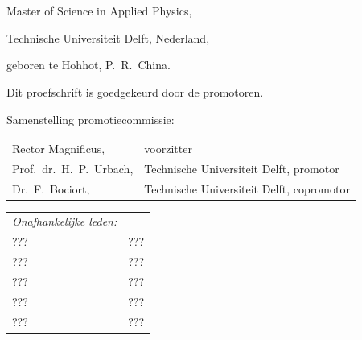 \begin{titlepage}
\begin{center}
\makeatletter
{\Large\titlefont\bfseries\@firstname\ {\titleshape\@lastname}}
\makeatother
\\
\vspace{3mm}
\begin{CJK*}{UTF8}{gkai}
\makeatletter
{\LARGE\titlefont\bfseries\@lastnameCH\ \hspace{1mm} {\titleshape\@firstnameCH}}
\makeatother
\end{CJK*}

\bigskip
\bigskip

Master of Science in Applied Physics,

Technische Universiteit Delft, Nederland,

geboren te Hohhot, P.~R.~China.

\vspace*{2\bigskipamount}

\end{center}

\clearpage
\thispagestyle{empty}

\noindent Dit proefschrift is goedgekeurd door de promotoren.



\medskip
\noindent Samenstelling promotiecommissie:

\medskip\noindent
\begin{tabular}{ll}
    Rector Magnificus, & voorzitter \\
    Prof.\ dr.\ H.\ P.\ Urbach, & Technische Universiteit Delft, promotor \\
    Dr.\ F.\ Bociort, & Technische Universiteit Delft, copromotor \\
\end{tabular}

\medskip
\medskip\noindent
\begin{tabular}{ll}
    \emph{Onafhankelijke leden:}\\
    ??? & ??? \\
    ??? & ??? \\
    ??? & ??? \\
    ??? & ??? \\
    ??? & ??? \\
\end{tabular}


\end{titlepage}
